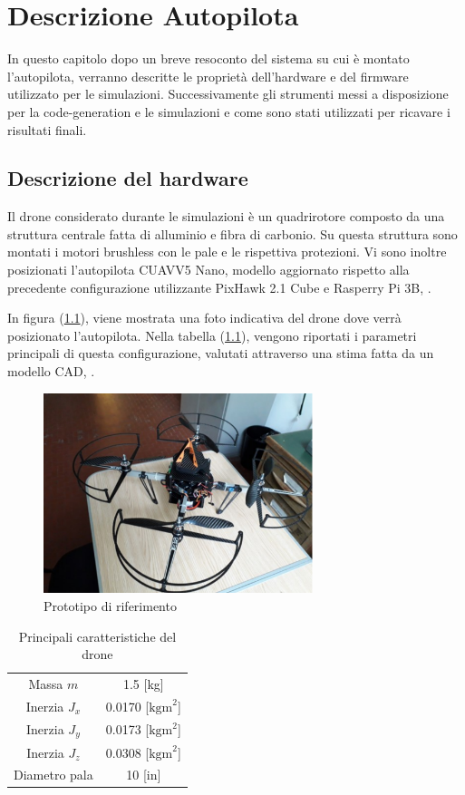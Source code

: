\chapter{Descrizione Autopilota}
In questo capitolo dopo un breve resoconto del sistema su cui è montato l'autopilota, verranno descritte le proprietà dell'hardware e del firmware utilizzato per le simulazioni. Successivamente gli strumenti messi a disposizione per la code-generation e le simulazioni e come sono stati utilizzati per ricavare i risultati finali.

\section{Descrizione del hardware}

Il drone considerato durante le simulazioni è un quadrirotore composto da una struttura centrale fatta di alluminio e fibra di carbonio. Su questa struttura sono montati i motori brushless con le pale e le rispettiva protezioni. Vi sono inoltre posizionati l'autopilota CUAV\textregistered V5 Nano\textregistered, modello aggiornato rispetto alla precedente configurazione utilizzante PixHawk 2.1 Cube e Rasperry Pi 3B, \cite{DesTestCarm}.

In figura (\ref{fig:DRONE}), viene mostrata una foto indicativa del drone dove verrà posizionato l'autopilota. Nella tabella (\ref{tab:DRONE}), vengono riportati i parametri principali di questa configurazione, valutati attraverso una stima fatta da un modello CAD, \cite{DesTestCarm}.

\begin{figure}
	\centering
	\includegraphics[width=0.7\textwidth]{DescrizioneAutopilota/Figure/DRONE}
	\caption{Prototipo di riferimento}
	\label{fig:DRONE}
\end{figure}

\begin{table}
	\centering
	\caption{Principali caratteristiche del drone}
	\begin{tabular}{c c}
		\hline
		Massa $m$ & 1.5 [kg] \\
		Inerzia $J_x$ & 0.0170 [$\text{kgm}^2$] \\
		Inerzia $J_y$ & 0.0173 [$\text{kgm}^2$] \\
		Inerzia $J_z$ & 0.0308 [$\text{kgm}^2$] \\
		Diametro pala & 10 [in]\\
		\hline
	\end{tabular}	
	\label{tab:DRONE}
\end{table}

